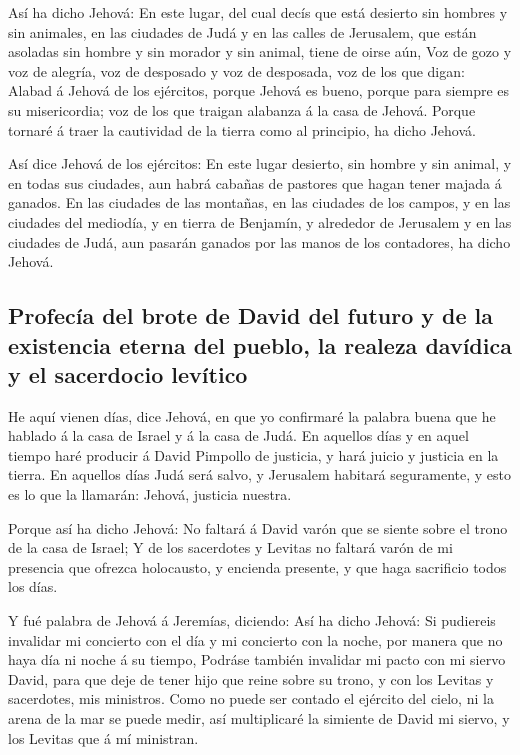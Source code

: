  Así ha dicho Jehová: En este lugar, del cual decís que
está desierto sin hombres y sin animales, en las ciudades de Judá y en
las calles de Jerusalem, que están asoladas sin hombre y sin morador y
sin animal, tiene de oirse aún,  Voz de gozo y voz de
alegría, voz de desposado y voz de desposada, voz de los que digan:
Alabad á Jehová de los ejércitos, porque Jehová es bueno, porque para
siempre es su misericordia; voz de los que traigan alabanza á la casa de
Jehová. Porque tornaré á traer la cautividad de la tierra como al
principio, ha dicho Jehová.

 Así dice Jehová de los ejércitos: En este lugar desierto,
sin hombre y sin animal, y en todas sus ciudades, aun habrá cabañas de
pastores que hagan tener majada á ganados.  En las ciudades
de las montañas, en las ciudades de los campos, y en las ciudades del
mediodía, y en tierra de Benjamín, y alrededor de Jerusalem y en las
ciudades de Judá, aun pasarán ganados por las manos de los contadores,
ha dicho Jehová.

\hypertarget{profecuxeda-del-brote-de-david-del-futuro-y-de-la-existencia-eterna-del-pueblo-la-realeza-davuxeddica-y-el-sacerdocio-levuxedtico}{%
\subsection{Profecía del brote de David del futuro y de la existencia
eterna del pueblo, la realeza davídica y el sacerdocio
levítico}\label{profecuxeda-del-brote-de-david-del-futuro-y-de-la-existencia-eterna-del-pueblo-la-realeza-davuxeddica-y-el-sacerdocio-levuxedtico}}

 He aquí vienen días, dice Jehová, en que yo confirmaré la
palabra buena que he hablado á la casa de Israel y á la casa de Judá.
 En aquellos días y en aquel tiempo haré producir á David
Pimpollo de justicia, y hará juicio y justicia en la tierra.
 En aquellos días Judá será salvo, y Jerusalem habitará
seguramente, y esto es lo que la llamarán: Jehová, justicia nuestra.

 Porque así ha dicho Jehová: No faltará á David varón que
se siente sobre el trono de la casa de Israel;  Y de los
sacerdotes y Levitas no faltará varón de mi presencia que ofrezca
holocausto, y encienda presente, y que haga sacrificio todos los días.

 Y fué palabra de Jehová á Jeremías, diciendo:
 Así ha dicho Jehová: Si pudiereis invalidar mi concierto
con el día y mi concierto con la noche, por manera que no haya día ni
noche á su tiempo,  Podráse también invalidar mi pacto con
mi siervo David, para que deje de tener hijo que reine sobre su trono, y
con los Levitas y sacerdotes, mis ministros.  Como no puede
ser contado el ejército del cielo, ni la arena de la mar se puede medir,
así multiplicaré la simiente de David mi siervo, y los Levitas que á mí
ministran.

